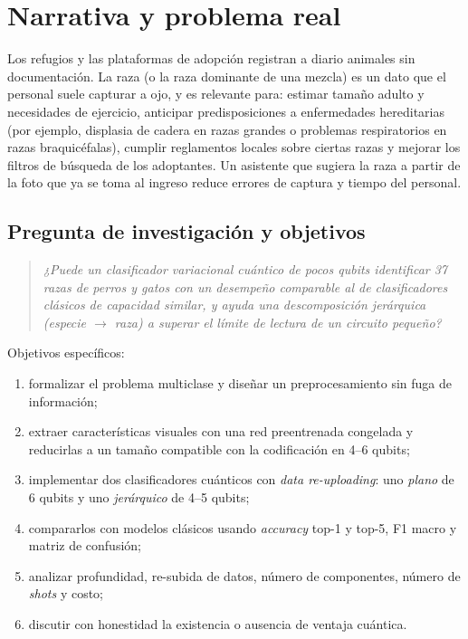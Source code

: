 \documentclass[11pt,letterpaper]{article}
\begin{document}
\section{Narrativa y problema real}
Los refugios y las plataformas de adopción registran a diario animales sin documentación. La raza
(o la raza dominante de una mezcla) es un dato que el personal suele capturar a ojo, y es relevante
para: estimar tamaño adulto y necesidades de ejercicio, anticipar predisposiciones a enfermedades
hereditarias (por ejemplo, displasia de cadera en razas grandes o problemas respiratorios en razas
braquicéfalas), cumplir reglamentos locales sobre ciertas razas y mejorar los filtros de búsqueda de
los adoptantes. Un asistente que sugiera la raza a partir de la foto que ya se toma al ingreso reduce
errores de captura y tiempo del personal.

\subsection{Pregunta de investigación y objetivos}
\begin{quote}
\emph{¿Puede un clasificador variacional cuántico de pocos qubits identificar 37 razas de perros y
gatos con un desempeño comparable al de clasificadores clásicos de capacidad similar, y ayuda una
descomposición jerárquica (especie $\to$ raza) a superar el límite de lectura de un circuito pequeño?}
\end{quote}
Objetivos específicos:
\begin{enumerate}[label=(\roman*),leftmargin=*]
\item formalizar el problema multiclase y diseñar un preprocesamiento sin fuga de información;
\item extraer características visuales con una red preentrenada congelada y reducirlas a un tamaño
compatible con la codificación en 4--6 qubits;
\item implementar dos clasificadores cuánticos con \emph{data re-uploading}: uno \emph{plano} de 6
qubits y uno \emph{jerárquico} de 4--5 qubits;
\item compararlos con modelos clásicos usando \emph{accuracy} top-1 y top-5, F1 macro y matriz de
confusión;
\item analizar profundidad, re-subida de datos, número de componentes, número de \emph{shots} y costo;
\item discutir con honestidad la existencia o ausencia de ventaja cuántica.
\end{enumerate}
\end{document}
